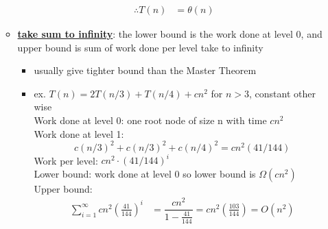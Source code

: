 \begin{itemize}
\begin{itemize}[leftmargin = 1em]
\begin{align*}
                \therefore T(n) &= \theta(n)
            \end{align*}
        \item \ul{\textbf{take sum to infinity}}: the lower bound is the work done at level 0, and upper bound is sum of work done per level take to infinity 
        \begin{itemize}[leftmargin = 1em]
            \item usually give tighter bound than the Master Theorem
            \item ex. $T(n) = 2T(n/3) + T(n/4) + cn^2$ for $n > 3$, constant other wise \\
            Work done at level 0: one root node of size n with time $cn^2$ \\
            Work done at level 1:
            \[c(n/3)^2 + c(n/3)^2 + c(n/4)^2 = cn^2(41/144)\] 
            Work per level: $cn^2 \cdot (41/144)^i$ \\
            Lower bound: work done at level 0 so lower bound is $ \Omega(cn^2)$\\
            Upper bound: 
            \begin{align*}
                \sum^\infty_{i=1} cn^2 \left(\frac{41}{144} \right)^i &= \dfrac{cn^2}{1-\frac{41}{144}} = cn^2 \left(\frac{103}{144} \right) = O(n^2)
            \end{align*}
        \end{itemize}
        
    \end{itemize}
\end{itemize}


